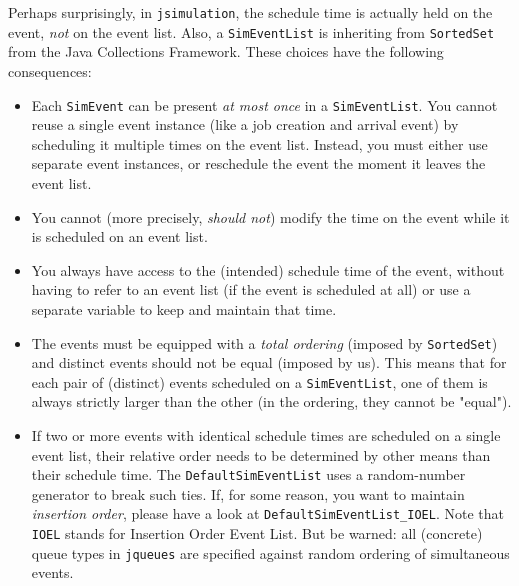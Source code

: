 Perhaps surprisingly,
  in \lstinline{jsimulation},
  the schedule time is actually held on the event,
 {\em not\/} on the event list.
Also, a \lstinline{SimEventList} is inheriting from \lstinline{SortedSet}
  from the Java Collections Framework.
These choices have the following consequences:
\begin{itemize}
  \item Each \lstinline{SimEvent} can be present {\em at most once\/}
        in a \lstinline{SimEventList}.
        You cannot reuse a single event instance
          (like a job creation and arrival event)
          by scheduling it multiple times on the event list.
        Instead, you must either use separate event instances,
          or reschedule the event the moment it leaves the event list.
  \item You cannot (more precisely, {\em should not\/})
          modify the time on the event while it is
          scheduled on an event list.
  \item You always have access to the (intended) schedule time of the event,
          without having to refer to an event list
          (if the event is scheduled at all)
          or use a separate variable
          to keep and maintain that time.
  \item The events must be equipped with a {\em total ordering\/}
          (imposed by \lstinline{SortedSet})
          and distinct events should not be equal (imposed by us).
          This means that for each pair of (distinct) events scheduled
          on a \lstinline{SimEventList},
          one of them is always strictly larger than the other
          (in the ordering, they cannot be "equal").
  \item If two or more events with identical schedule times are
          scheduled on a single event list,
          their relative order needs to be determined by other means
          than their schedule time.
        The \lstinline|DefaultSimEventList| uses a
          random-number generator to break such ties.
        If, for some reason,
          you want to maintain {\em insertion order\/},
          please have a look at \lstinline|DefaultSimEventList_IOEL|.
        Note that \lstinline|IOEL| stands for Insertion Order Event List.
        But be warned: all (concrete) queue types in \lstinline{jqueues}
          are specified against random ordering
          of simultaneous events.
\end{itemize}

